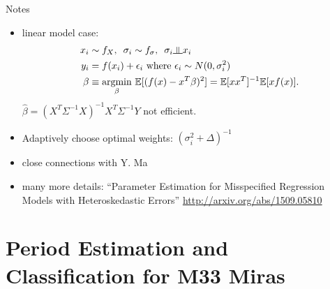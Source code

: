 \documentclass[12pt]{beamer}
\newcommand{\argmin}[1]{\underset{#1}{\operatorname{argmin}}\text{ }}
\newcommand{\E}{\mathbb{E}}
\newcommand{\indep}{\rotatebox[origin=c]{90}{$\models$}}
\begin{document}
\begin{frame}{Notes}
\begin{itemize}
\item linear model case:
\begin{align*}
x_i &\sim f_X, \, \, \, \sigma_i \sim f_\sigma, \, \, \, \sigma_i \indep x_i\\
y_i &= f(x_i) + \epsilon_i \text{ where } \epsilon_i \sim N(0,\sigma_i^2)\\
\beta &\equiv \argmin{\beta} \E[(f(x) - x^T\beta)^2] = \E[xx^T]^{-1}\E[xf(x)].
\end{align*}
$\widehat{\beta} = (X^T\Sigma^{-1}X)^{-1}X^T\Sigma^{-1}Y$ not efficient.
\item Adaptively choose optimal weights: $(\sigma_i^2 + \Delta)^{-1}$
\item close connections with Y. Ma \cite{ma2006efficient,ma2013doubly}
\item many more details: ``Parameter Estimation for Misspecified Regression Models with Heteroskedastic Errors'' \url{http://arxiv.org/abs/1509.05810}
\end{itemize}
\end{frame}



\section{Period Estimation and Classification for M33 Miras}
\end{document}
